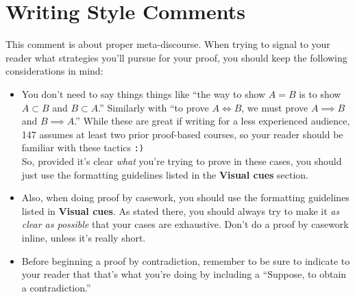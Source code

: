 \documentclass{fkpset}
\begin{document}
\section{Writing Style Comments}
\begin{problem}[A1]
  This comment is about proper meta-discourse. When trying to signal to your
  reader what strategies you'll pursue for your proof, you should keep the
  following considerations in mind:\\
  \begin{adjustwidth}{0pt}{1em}
    \begin{itemize}
      \item You don't need to say things things like ``the way to show $A = B$
        is to show $A \subset B$ and $B \subset A$.'' Similarly with ``to prove
        $A \iff B$, we must prove $A \implies B$ and $B \implies A$.'' While
        these are great if writing for a less experienced audience, 147 assumes
        at least two prior proof-based courses, so your reader should be
        familiar with these tactics \texttt{:)}\\

        So, provided it's clear \emph{what} you're trying to prove in these
        cases, you should just use the formatting guidelines listed in the
        \textbf{Visual cues} section.\\
      \item Also, when doing proof by casework, you should use the formatting
        guidelines listed in \textbf{Visual cues}. As stated there, you should
        always try to make it \emph{as clear as possible} that your cases are
        exhaustive. Don't do a proof by casework inline, unless it's really
        short.\\
      \item Before beginning a proof by contradiction, remember to be sure to
        indicate to your reader that that's what you're doing by including a
        ``Suppose, to obtain a contradiction.''\\
    \end{itemize}
  \end{adjustwidth}
\end{problem}
\end{document}
